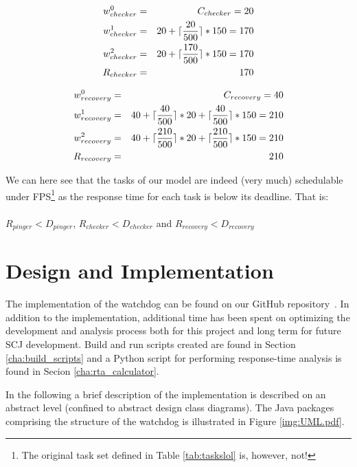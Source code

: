 \begin{eqnarray}
    w_{checker}^0 &=& C_{checker} = 20 \nonumber \\ 
    w_{checker}^1 &=& 20 + \lceil\frac{20}{500}\rceil*150 = 170 \nonumber \\ 
    w_{checker}^2 &=& 20 + \lceil\frac{170}{500}\rceil*150 = 170 \nonumber \\
    R_{checker} &=& 170
\end{eqnarray}

\begin{eqnarray}
    w_{recovery}^0 &=& C_{recovery} = 40 \nonumber \\ 
    w_{recovery}^1 &=& 40 + \lceil\frac{40}{500}\rceil*20 + \lceil\frac{40}{500}\rceil*150 = 210 \nonumber \\ 
    w_{recovery}^2 &=& 40 + \lceil\frac{210}{500}\rceil*20 + \lceil\frac{210}{500}\rceil*150 = 210 \nonumber \\
    R_{recovery} &=& 210
\end{eqnarray}

We can here see that the tasks of our model are indeed (very much) schedulable under FPS\footnote{The original task set defined in Table \ref{tab:taskslol} is, however, not!} as the response time for each task is below its deadline. That is: \\\\
$R_{pinger} < D_{pinger}$, $R_{checker} < D_{checker}$ and $R_{recovery} < D_{recovery}$

\section{Design and Implementation}
The implementation of the watchdog can be found on our GitHub repository~\cite{SW902e12:CSPinSCJ}. In addition to the implementation, additional time has been spent on optimizing the development and analysis process both for this project and long term for future SCJ development. Build and run scripts created are found in Section \ref{cha:build_scripts} and a Python script for performing response-time analysis is found in Secion \ref{cha:rta_calculator}.

In the following a brief description of the implementation is described on an abstract level (confined to abstract design class diagrams). The Java packages comprising the structure of the watchdog is illustrated in Figure \ref{img:UML.pdf}. 

